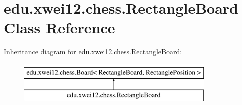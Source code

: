 \hypertarget{classedu_1_1xwei12_1_1chess_1_1_rectangle_board}{}\section{edu.\+xwei12.\+chess.\+Rectangle\+Board Class Reference}
\label{classedu_1_1xwei12_1_1chess_1_1_rectangle_board}
Inheritance diagram for edu.\+xwei12.\+chess.\+Rectangle\+Board\+:\begin{figure}[H]
\begin{center}
\leavevmode
\includegraphics[height=2.000000cm]{classedu_1_1xwei12_1_1chess_1_1_rectangle_board}
\end{center}
\end{figure}
